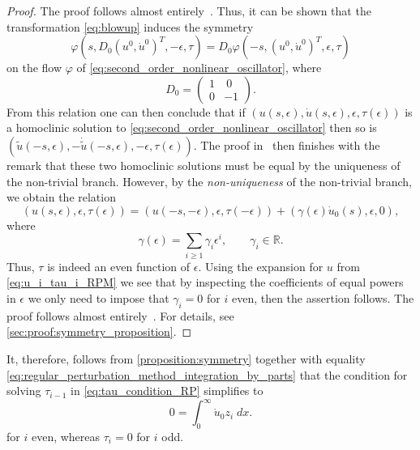 \begin{proof}
    \ifthesis
    The proof follows almost entirely~\cite[Proposition 4.2]{Beyn_1994}. Thus,
    it can be shown that the transformation \cref{eq:blowup} induces the
    symmetry
    \[
        \varphi(s, D_0 (u^0, \dot u^0)^T, -\epsilon, \tau)
        =
        D_0 \varphi(-s, (u^0, \dot u^0)^T, \epsilon, \tau)
    \] 
    on the flow $\varphi$ of \cref{eq:second_order_nonlinear_oscillator}, where 
    \[
        D_0 = \begin{pmatrix} 1 & ~0 \\  0 & -1 \end{pmatrix}.
    \] 
    From this relation one can then conclude that if $(u(s,\epsilon), \dot
    u(s,\epsilon), \epsilon, \tau(\epsilon))$ is a homoclinic solution to
    \cref{eq:second_order_nonlinear_oscillator} then so is $(\tilde
    u(-s,\epsilon), -\dot{\tilde{u}}(-s,\epsilon), -\epsilon, \tau(\epsilon))$.
    The proof in~\cite{Beyn_1994} then finishes with the remark that these two
    homoclinic solutions must be equal by the uniqueness of the non-trivial
    branch. However, by the \emph{non-uniqueness} of the non-trivial branch, we
    obtain the relation
    \[
        (u(s,\epsilon), \epsilon, \tau(\epsilon))
        =
        (u(-s,-\epsilon), \epsilon, \tau(-\epsilon))
        +
        (\gamma(\epsilon) \dot u_0(s), \epsilon, 0),
    \]
    where
    \begin{equation}
        \label{eq:gamma}
        \gamma(\epsilon) = \sum_{i\geq 1} \gamma_i \epsilon^i,
        \qquad
        \gamma_i \in \mathbb R.
    \end{equation}
    Thus, $\tau$ is indeed an even function of $\epsilon$. Using the expansion
    for $u$ from \cref{eq:u_i_tau_i_RPM} we see that by inspecting the
    coefficients of equal powers in $\epsilon$ we only need to impose that
    $\gamma_i=0$ for $i$ even, then the assertion follows.
    \else
    The proof follows almost entirely~\cite[Proposition 4.2]{Beyn_1994}. For
    details, see \cref{sec:proof:symmetry_proposition}.
    \fi
\end{proof}

It, therefore, follows from \cref{proposition:symmetry} together with equality
\cref{eq:regular_perturbation_method_integration_by_parts} that the condition for
solving $\tau_{i-1}$ in \cref{eq:tau_condition_RP} simplifies to
\begin{equation}
    \label{eq:tau_condition_RP}
    0 = \int_0^\infty \dot u_0 z_i \; dx.
\end{equation}
for $i$ even, whereas $\tau_i=0$ for $i$ odd.

